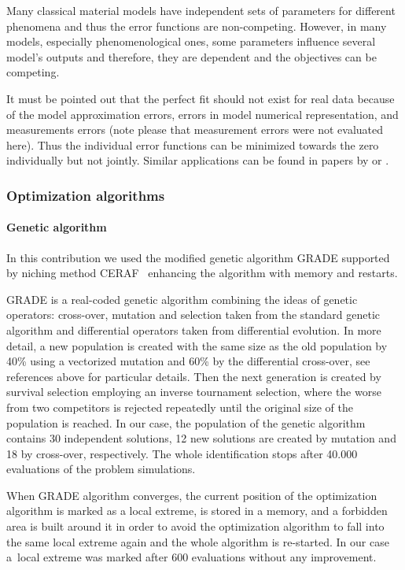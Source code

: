 \documentclass[review,times,3p,10pt]{elsarticle}
\begin{document}
{Many classical material models have independent sets of parameters for different phenomena and thus the error
functions are non-competing. However, in many models, especially phenomenological ones, some parameters influence
several model's outputs and therefore, they are dependent and the objectives can be competing.

It must be pointed out that the perfect fit should not exist for real data because of the 
model approximation errors, errors in model numerical representation, and 
measurements errors (note please that measurement errors were not evaluated here). Thus the individual error
functions can be minimized towards the zero individually but not jointly.
Similar applications can be found in papers by  \cite{Kuraz:2010:JCAM} or \cite{Gong:2015}. 





}






\subsubsection{Optimization algorithms}%
\label{optima}

\paragraph{Genetic algorithm}

In this contribution we used the modified genetic algorithm GRADE \citep{grade,Kucerova:2007:PHD} supported by niching method CERAF~\citep{Hrstka} enhancing the algorithm with
memory and restarts. { GRADE is a real-coded genetic algorithm combining the ideas of genetic operators: cross-over, mutation and selection
taken from the standard genetic algorithm and differential operators taken from differential evolution. In more detail,
a new population is created with the same size as the old population by 40\% using a vectorized mutation and 60\% by
the differential cross-over, see references above for particular details. Then the next generation is created by
survival selection employing an inverse tournament selection, where the worse from two competitors is rejected
repeatedly until the original size of the population is reached. In our case, the population of the genetic
algorithm contains 30 independent solutions, 12 new solutions are created by mutation and 18 by cross-over, respectively. The whole identification stops after 40.000 evaluations of the problem  simulations.

When GRADE algorithm converges, the current position of the optimization algorithm is marked as a local extreme, is
stored in a memory, and a forbidden area is built around it in order to avoid the optimization algorithm to fall into
the same local extreme again and the whole algorithm is re-started. In our case a~local extreme was marked after 600
evaluations without any improvement.}
\end{document}
